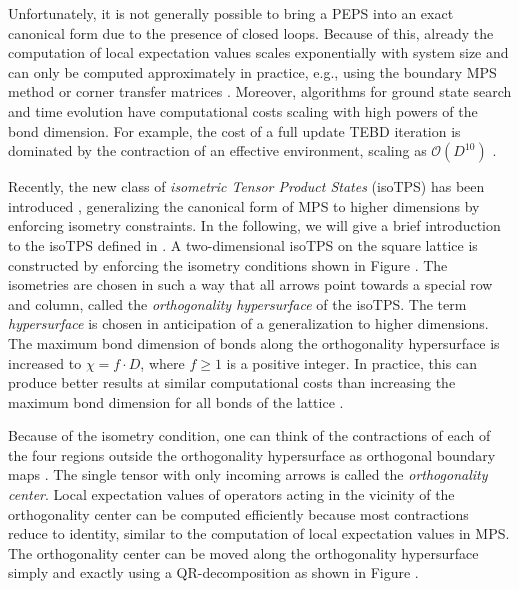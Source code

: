 Unfortunately, it is not generally possible to bring a PEPS into an exact canonical form due to the presence of closed loops. Because of this, already the computation of local expectation values scales exponentially with system size and can only be computed approximately in practice, e.g., using the boundary MPS method \cite{cite:practical_introduction_MPS_and_PEPS} or corner transfer matrices \cite{cite:CTMRG}. Moreover, algorithms for ground state search and time evolution have computational costs scaling with high powers of the bond dimension. For example, the cost of a full update TEBD iteration is dominated by the contraction of an effective environment, scaling as $\mathcal{O}\left(D^{10}\right)$ \cite{cite:unifying_PEPS_contractions}. \par
Recently, the new class of \textit{isometric Tensor Product States} (isoTPS) has been introduced \cite{cite:isometric_tensor_network_states_in_two_dimensions, cite:conversion_of_PEPS_into_a_canonical_form, cite:DMRG_approach_to_optimizing_2D_tensor_networks}, generalizing the canonical form of MPS to higher dimensions by enforcing isometry constraints. In the following, we will give a brief introduction to the isoTPS defined in \cite{cite:isometric_tensor_network_states_in_two_dimensions}. A two-dimensional isoTPS on the square lattice is constructed by enforcing the isometry conditions shown in Figure . The isometries are chosen in such a way that all arrows point towards a special row and column, called the \textit{orthogonality hypersurface} of the isoTPS. The term \textit{hypersurface} is chosen in anticipation of a generalization to higher dimensions. The maximum bond dimension of bonds along the orthogonality hypersurface is increased to $\chi = f\cdot D$, where $f \ge 1$ is a positive integer. In practice, this can produce better results at similar computational costs than increasing the maximum bond dimension for all bonds of the lattice \cite{cite:efficient_simulation_of_dynamics_in_two_dimensional_quantum_spin_systems}. \par
Because of the isometry condition, one can think of the contractions of each of the four regions outside the orthogonality hypersurface as orthogonal boundary maps \cite{cite:efficient_simulation_of_dynamics_in_two_dimensional_quantum_spin_systems}. The single tensor with only incoming arrows is called the \textit{orthogonality center}. Local expectation values of operators acting in the vicinity of the orthogonality center can be computed efficiently because most contractions reduce to identity, similar to the computation of local expectation values in MPS. The orthogonality center can be moved along the orthogonality hypersurface simply and exactly using a QR-decomposition as shown in Figure .\par
